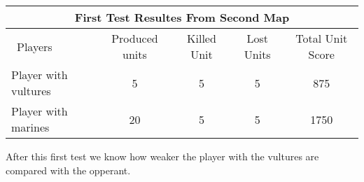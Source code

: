 \begin{centering}
 \begin{tabular}{|l||c|c|c|c|}
	\multicolumn{5}{c}{First Test Resultes From Second Map} \\
	\hline
	\ Players & Produced units & Killed Unit & Lost Units &  Total Unit Score \\
	\hline
	\hline
		Player with vultures & 5 & 5 & 5  & 875\\
	\hline
		Player with marines & 20 & 5 & 5 & 1750\\
	\hline

\end{tabular}
\end{centering}

After this first test we know how weaker the player with the vultures are compared with the opperant. 